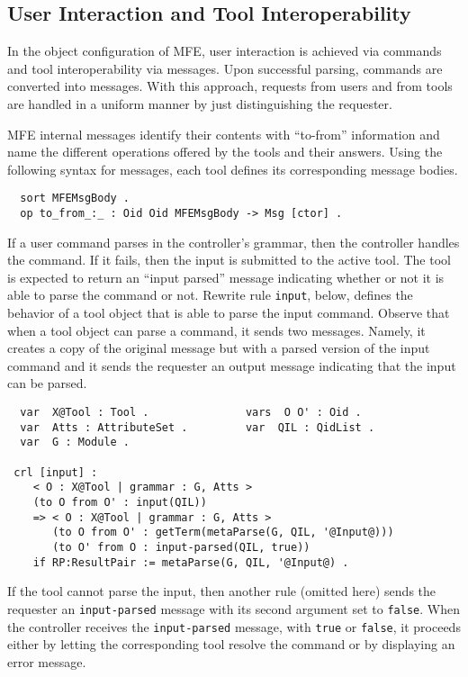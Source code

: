 \subsection{User Interaction and Tool Interoperability}

In the object configuration of MFE, user interaction is achieved via commands
and tool interoperability via messages. Upon successful parsing, commands 
are converted into messages. With this approach, requests from users and from 
tools are handled in a uniform manner by just distinguishing the requester. 

MFE internal messages identify their contents with ``to-from''
information and name the different operations offered by 
the tools and their answers.
Using the following syntax for messages, each tool defines 
its corresponding message bodies.

\begin{small}
\begin{verbatim}
  sort MFEMsgBody .
  op to_from_:_ : Oid Oid MFEMsgBody -> Msg [ctor] .
\end{verbatim}
\end{small}
%
If a user command parses in the controller's grammar, then the controller handles the command.
If it fails, then the input is submitted to the active tool.
The tool is expected to return an ``input parsed'' message indicating whether or not
it is able to parse the command or not. Rewrite rule {\tt input}, below,
defines the behavior of a tool object that is able to parse the
input command. Observe that when a tool object can parse
a command, it sends two messages. Namely, it creates a copy of
the original message but with a parsed version 
of the input command and it sends the requester an output message
indicating that the input can be parsed.

\begin{small}
\begin{verbatim}
  var  X@Tool : Tool .               vars  O O' : Oid .
  var  Atts : AttributeSet .         var  QIL : QidList .
  var  G : Module .
 
 crl [input] :
    < O : X@Tool | grammar : G, Atts >
    (to O from O' : input(QIL))
    => < O : X@Tool | grammar : G, Atts >
       (to O from O' : getTerm(metaParse(G, QIL, '@Input@)))
       (to O' from O : input-parsed(QIL, true))
    if RP:ResultPair := metaParse(G, QIL, '@Input@) .
\end{verbatim}
\end{small}
%
If the tool cannot parse the input, then another rule (omitted here)
sends the requester an \texttt{input-parsed} message with its second argument 
set to \texttt{false}. When the controller receives the \texttt{input-parsed} 
message, with \texttt{true} or \texttt{false}, it proceeds either by letting 
the corresponding tool resolve the command or by displaying an error 
message. 
